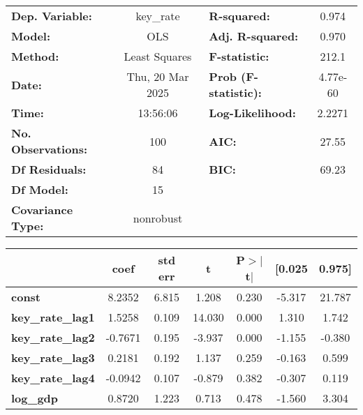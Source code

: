 \begin{center}
\begin{tabular}{lclc}
\toprule
\textbf{Dep. Variable:}    &    key\_rate     & \textbf{  R-squared:         } &     0.974   \\
\textbf{Model:}            &       OLS        & \textbf{  Adj. R-squared:    } &     0.970   \\
\textbf{Method:}           &  Least Squares   & \textbf{  F-statistic:       } &     212.1   \\
\textbf{Date:}             & Thu, 20 Mar 2025 & \textbf{  Prob (F-statistic):} &  4.77e-60   \\
\textbf{Time:}             &     13:56:06     & \textbf{  Log-Likelihood:    } &    2.2271   \\
\textbf{No. Observations:} &         100      & \textbf{  AIC:               } &     27.55   \\
\textbf{Df Residuals:}     &          84      & \textbf{  BIC:               } &     69.23   \\
\textbf{Df Model:}         &          15      & \textbf{                     } &             \\
\textbf{Covariance Type:}  &    nonrobust     & \textbf{                     } &             \\
\bottomrule
\end{tabular}
\begin{tabular}{lcccccc}
                         & \textbf{coef} & \textbf{std err} & \textbf{t} & \textbf{P$> |$t$|$} & \textbf{[0.025} & \textbf{0.975]}  \\
\midrule
\textbf{const}           &       8.2352  &        6.815     &     1.208  &         0.230        &       -5.317    &       21.787     \\
\textbf{key\_rate\_lag1} &       1.5258  &        0.109     &    14.030  &         0.000        &        1.310    &        1.742     \\
\textbf{key\_rate\_lag2} &      -0.7671  &        0.195     &    -3.937  &         0.000        &       -1.155    &       -0.380     \\
\textbf{key\_rate\_lag3} &       0.2181  &        0.192     &     1.137  &         0.259        &       -0.163    &        0.599     \\
\textbf{key\_rate\_lag4} &      -0.0942  &        0.107     &    -0.879  &         0.382        &       -0.307    &        0.119     \\
\textbf{log\_gdp}        &       0.8720  &        1.223     &     0.713  &         0.478        &       -1.560    &        3.304     \\

\end{tabular}
\end{center}
